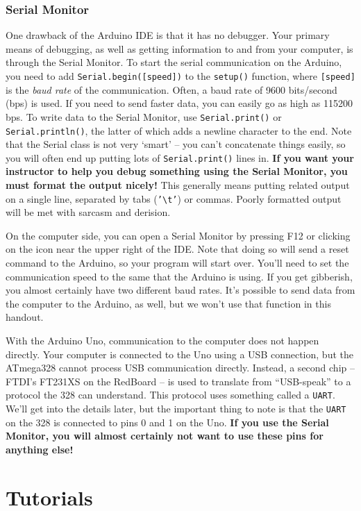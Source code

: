 \documentclass[11pt]{article} %
\begin{document}
\subsubsection*{Serial Monitor}

One drawback of the Arduino IDE is that it has no debugger. Your primary means of debugging, as well as getting information to and from your computer, is through the Serial Monitor. To start the serial communication on the Arduino, you need to add \verb|Serial.begin([speed])| to the \verb|setup()| function, where \verb|[speed]| is the \emph{baud rate} of the communication. Often, a baud rate of 9600 bits/second (bps) is used. If you need to send faster data, you can easily go as high as 115200 bps. To write data to the Serial Monitor, use \verb|Serial.print()| or \verb|Serial.println()|, the latter of which adds a newline character to the end. Note that the Serial class is not very `smart' -- you can't concatenate things easily, so you will often end up putting lots of \verb|Serial.print()| lines in. {\bf If you want your instructor to help you debug something using the Serial Monitor, you must format the output nicely!} This generally means putting related output on a single line, separated by tabs (\verb|’\t’|) or commas. Poorly formatted output will be met with sarcasm and derision.

On the computer side, you can open a Serial Monitor by pressing F12 or clicking on the icon near the upper right of the IDE. Note that doing so will send a reset command to the Arduino, so your program will start over. You'll need to set the communication speed to the same that the Arduino is using. If you get gibberish, you almost certainly have two different baud rates. It's possible to send data from the computer to the Arduino, as well, but we won't use that function in this handout.

With the Arduino Uno, communication to the computer does not happen directly. Your computer is connected to the Uno using a USB connection, but the ATmega328 cannot process USB communication directly. Instead, a second chip -- FTDI’s FT231XS on the RedBoard -- is used to translate from “USB-speak” to a protocol the 328 can understand. This protocol uses something called a \verb|UART|. We’ll get into the details later, but the important thing to note is that the \verb|UART| on the 328 is connected to pins 0 and 1 on the Uno. {\bf If you use the Serial Monitor, you will almost certainly not want to use these pins for anything else!}

\section*{Tutorials}
\label{sec:tutorials}
\end{document}
